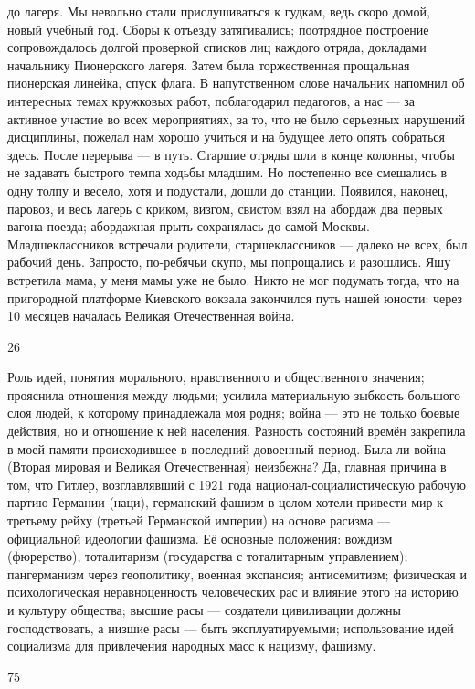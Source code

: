 до лагеря. Мы невольно стали прислушиваться к гудкам, ведь скоро домой, новый учебный год. Сборы к отъезду затягивались; поотрядное построение сопровождалось долгой проверкой списков лиц каждого отряда, докладами начальнику Пионерского лагеря. Затем была торжественная прощальная пионерская линейка, спуск флага. В напутственном слове начальник напомнил об интересных темах кружковых работ, поблагодарил педагогов, а нас — за активное участие во всех мероприятиях, за то, что не было серьезных нарушений дисциплины, пожелал нам хорошо учиться и на будущее лето опять собраться здесь. После перерыва — в путь. Старшие отряды шли в конце колонны, чтобы не задавать быстрого темпа ходьбы младшим. Но постепенно все смешались в одну толпу и весело, хотя и подустали, дошли до станции. Появился, наконец, паровоз, и весь лагерь с криком, визгом, свистом взял на абордаж два первых вагона поезда; абордажная прыть сохранялась до самой Москвы. Младшеклассников встречали родители, старшеклассников — далеко не всех, был рабочий день. Запросто, по-ребячьи скупо, мы попрощались и разошлись. Яшу встретила мама, у меня мамы уже не было. Никто не мог подумать тогда, что на пригородной платформе Киевского вокзала закончился путь нашей юности: через 10 месяцев началась Великая Отечественная война.

26

Роль идей, понятия морального, нравственного и общественного значения; прояснила отношения между людьми; усилила материальную зыбкость большого слоя людей, к которому принадлежала моя родня; война — это не только боевые действия, но и отношение к ней населения. Разность состояний времён закрепила в моей памяти происходившее в последний довоенный период. Была ли война (Вторая мировая и Великая Отечественная) неизбежна? Да, главная причина в том, что Гитлер, возглавлявший с 1921 года национал-социалистическую рабочую партию Германии (наци), германский фашизм в целом хотели привести мир к третьему рейху (третьей Германской империи) на основе расизма — официальной идеологии фашизма. Её основные положения: вождизм (фюрерство), тоталитаризм (государства с тоталитарным управлением); пангерманизм через геополитику, военная экспансия; антисемитизм; физическая и психологическая неравноценность человеческих рас и влияние этого на историю и культуру общества; высшие расы — создатели цивилизации должны господствовать, а низшие расы — быть эксплуатируемыми; использование идей социализма для привлечения народных масс к нацизму, фашизму.

75

